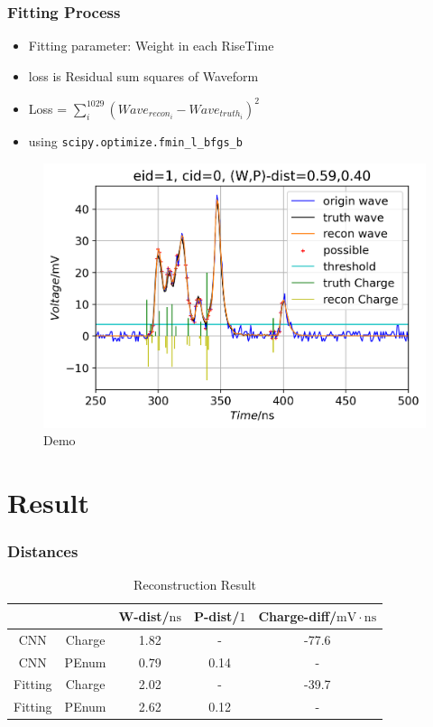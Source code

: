 \documentclass{beamer}
\begin{document}
\begin{frame}
\frametitle{Fitting Process}
\begin{itemize}
    \item Fitting parameter: Weight in each RiseTime
    \item loss is Residual sum squares of Waveform
    \item Loss = $\sum_{i}^{1029}(Wave_{recon_i}-Wave_{truth_i})^{2}$
    \item using \lstinline{scipy.optimize.fmin_l_bfgs_b}
\end{itemize}
\setlength{\belowcaptionskip}{0mm}
\begin{figure}
    \centering
    \caption{Demo}
    \includegraphics[width=0.7\linewidth]{img/demo.png}
\end{figure}
\end{frame}

    

\section{Result}
\begin{frame}
\frametitle{Distances}
\begin{table}
    \centering
    \caption{Reconstruction Result}
    \begin{tabular}{c|c|c|c|c}
        \hline
        &  & W-dist/$\mathrm{ns}$ & P-dist/$\mathrm{1}$ & Charge-diff/$\mathrm{mV}\cdot\mathrm{ns}$ \\
        \hline
        CNN & Charge & 1.82 & - & -77.6 \\
        \hline
        CNN & PEnum & 0.79 & 0.14 & - \\
        \hline
        Fitting & Charge & 2.02 & - & -39.7 \\
        \hline
        Fitting & PEnum & 2.62 & 0.12 & - \\
        \hline
    \end{tabular}
\end{table}
\end{frame}
\end{document}
